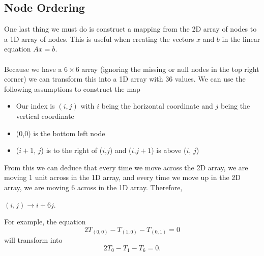 \documentclass[12pt,a4paper]{article}
\begin{document}
\subsection{Node Ordering}
One last thing we must do is construct a mapping from the 2D array of nodes to a 1D array of nodes. This is useful when creating the vectors $x$ and $b$ in the linear equation $Ax=b$.
\\\\
Because we have a $6 \times 6$ array (ignoring the missing or null nodes in the top right corner) we can transform this into a 1D array with 36 values. We can use the following assumptions to construct the map \begin{itemize}
\item Our index is $(i,j)$ with $i$ being the horizontal coordinate and $j$ being the vertical coordinate 
\item (0,0) is the bottom left node 
\item ($i+1$, $j$) is to the right of ($i$,$j$) and ($i$,$j+1$) is above ($i$, $j$)
\end{itemize}
From this we can deduce that every time we move across the 2D array, we are moving 1 unit across in the 1D array, and every time we move up in the 2D array, we are moving 6 across in the 1D array. Therefore,
\begin{center}
$(i,j) \to i+6j$.
\end{center}
For example, the equation
\[2T_{(0,0)}-T_{(1,0)}-T_{(0,1)}=0\]
will transform into
\[2T_0-T_1-T_6=0.\]
\end{document}
